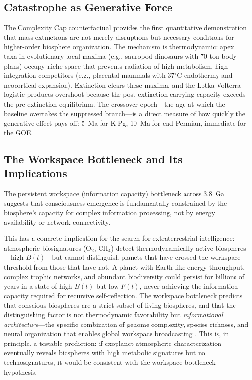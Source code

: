 \documentclass[10pt,letterpaper]{article}
\begin{document}
\subsection*{Catastrophe as Generative Force}

The Complexity Cap counterfactual provides the first quantitative demonstration
that mass extinctions are not merely disruptions but necessary conditions for
higher-order biosphere organization. The mechanism is thermodynamic: apex taxa
in evolutionary local maxima (e.g., sauropod dinosaurs with 70-ton body plans)
occupy niche space that prevents radiation of high-metabolism, high-integration
competitors (e.g., placental mammals with 37$^\circ$C endothermy and neocortical
expansion). Extinction clears these maxima, and the Lotka-Volterra logistic
produces overshoot because the post-extinction carrying capacity exceeds the
pre-extinction equilibrium. The crossover epoch---the age at which the baseline
overtakes the suppressed branch---is a direct measure of how quickly the
generative effect pays off: 5~Ma for K-Pg, 10~Ma for end-Permian, immediate
for the GOE.

\subsection*{The Workspace Bottleneck and Its Implications}

The persistent workspace (information capacity) bottleneck across 3.8~Ga
suggests that consciousness emergence is fundamentally constrained by the
biosphere's capacity for complex information processing, not by energy
availability or network connectivity.

This has a concrete implication for the search for extraterrestrial
intelligence: atmospheric biosignatures ($\text{O}_2$, $\text{CH}_4$) detect
thermodynamically active biospheres---high $B(t)$---but cannot distinguish
planets that have crossed the workspace threshold from those that have not.
A planet with Earth-like energy throughput, complex trophic networks, and
abundant biodiversity could persist for billions of years in a state of
high $B(t)$ but low $F(t)$, never achieving the information capacity
required for recursive self-reflection. The workspace bottleneck predicts
that conscious biospheres are a strict subset of living biospheres, and that
the distinguishing factor is not thermodynamic favorability but
\emph{informational architecture}---the specific combination of genome
complexity, species richness, and neural organization that enables global
workspace broadcasting \cite{baars1988}. This is, in principle, a testable
prediction: if exoplanet atmospheric characterization eventually reveals
biospheres with high metabolic signatures but no technosignatures, it would
be consistent with the workspace bottleneck hypothesis.
\end{document}

